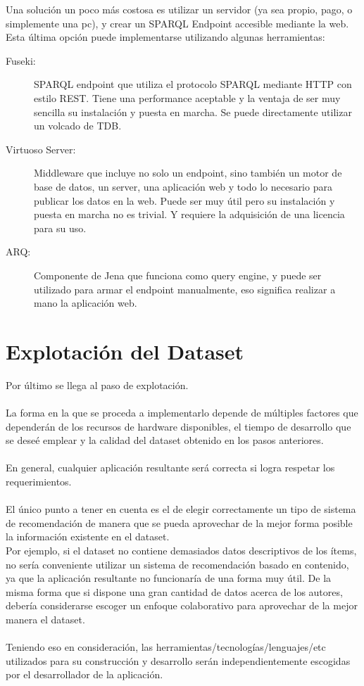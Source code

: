 Una solución un poco más costosa es utilizar un servidor (ya sea propio, pago, o simplemente una pc), y crear un SPARQL Endpoint accesible mediante la web.
Esta última opción puede implementarse utilizando algunas herramientas:
\begin{description}
\item [Fuseki:] SPARQL endpoint que utiliza el protocolo SPARQL mediante HTTP con estilo REST. Tiene una performance aceptable y la ventaja de ser muy sencilla su instalación y puesta en marcha. Se puede directamente utilizar un volcado de TDB.

\item [Virtuoso Server:] Middleware que incluye no solo un endpoint, sino también un motor de base de datos, un server, una aplicación web y todo lo necesario para publicar los datos en la web. Puede ser muy útil pero su instalación y puesta en marcha no es trivial. Y requiere la adquisición de una licencia para su uso.

\item [ARQ:] Componente de Jena que funciona como query engine, y puede ser utilizado para armar el endpoint manualmente, eso significa realizar a mano la aplicación web.
\end{description}
\section{Explotación del Dataset}
\label{section:explotacion}

\noindent Por último se llega al paso de explotación. 
\\\\
La forma en la que se proceda a implementarlo depende de múltiples factores que dependerán 
de los recursos de hardware disponibles, el tiempo de desarrollo que se deseé emplear y 
la calidad del dataset obtenido en los pasos anteriores.
\\\\
En general, cualquier aplicación resultante será correcta si logra respetar los requerimientos.
\\\\
El único punto a tener en cuenta es el de elegir correctamente un tipo de sistema de recomendación 
de manera que se pueda aprovechar de la mejor forma posible la información existente en el dataset. \\
Por ejemplo, si el dataset no contiene demasiados datos descriptivos de los ítems, no sería 
conveniente utilizar un sistema de recomendación basado en contenido, ya que la aplicación resultante 
no funcionaría de una forma muy útil.
De la misma forma que si dispone una gran cantidad de datos acerca de los autores, debería considerarse 
escoger un enfoque colaborativo para aprovechar de la mejor manera el dataset.
\\
\\
Teniendo eso en consideración, las herramientas/tecnologías/lenguajes/etc utilizados para su 
construcción y desarrollo serán independientemente escogidas por el desarrollador de la aplicación.
